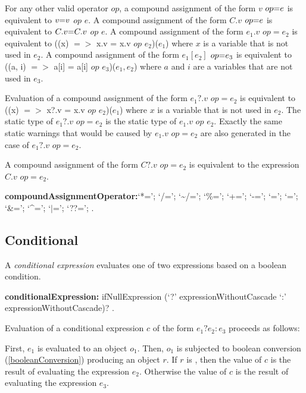 \documentclass{article}
\newcommand{\code}[1]{{\sf #1}}
\begin{document}
\LMHash{}
For any other valid operator $op$, a compound assignment of the form $v$ $op\code{=} e$ is equivalent to $v \code{=} v$ $op$ $e$. A compound assignment of the form $C.v$ $op \code{=} e$ is equivalent to $C.v \code{=} C.v$ $op$ $e$. A compound assignment of the form $e_1.v$ $op = e_2$ is equivalent to \code{((x) $=>$ x.v = x.v $op$ $e_2$)($e_1$)} where $x$ is a variable that is not used in $e_2$. A compound assignment of the form  $e_1[e_2]$ $op\code{=} e_3$ is equivalent to 
\code{((a, i) $=>$ a[i] = a[i] $op$ $e_3$)($e_1, e_2$)} where $a$ and $i$ are a variables that are not used in $e_3$. 

\LMHash{}
Evaluation of a compound assignment of the form $e_1?.v$ $op = e_2$ is equivalent to \code{((x) $=>$ x?.v = x.v $op$ $e_2$)($e_1$)} where $x$ is a variable that is not used in $e_2$. The static type of $e_1?.v$ $op = e_2$ is the static type of $e_1.v$ $op$ $e_2$. Exactly the same static warnings that would be caused by $e_1.v$ $op = e_2$ are also generated in the case of $e_1?.v$ $op = e_2$.

\LMHash{}
A compound assignment of the form $C?.v$ $op = e_2$ is equivalent to the expression 
$C.v$ $op = e_2$. 

\begin{grammar}
{\bf compoundAssignmentOperator:}`*=';
      `/=';
      `\~{}/=';
      `\%=';
      `+=';
      `-=';
      `{\escapegrammar \lt \lt}=';
       `{\escapegrammar \gt \gt}=';
      `\&=';
      `\^{}=';
      `$|$=';
      `??=';
    .
\end{grammar}

    
\subsection{ Conditional}

\LMHash{}
A {\em conditional expression} evaluates one of two expressions based on a boolean condition.

\begin{grammar}
  {\bf conditionalExpression:}
     ifNullExpression (`?' expressionWithoutCascade `{\escapegrammar :}' expressionWithoutCascade)?
    . %
\end{grammar}

\LMHash{}
Evaluation of a conditional expression $c$ of the form $e_1 ? e_2 : e_3$ proceeds as follows:

\LMHash{}
First, $e_1$ is evaluated to an object $o_1$.  Then, $o_1$ is  subjected to boolean conversion (\ref{booleanConversion}) producing an object $r$.  If $r$ is \TRUE, then the value of $c$ is the result of evaluating the expression $e_2$. Otherwise the value of $c$ is the result of evaluating the expression $e_3$. 
\end{document}
